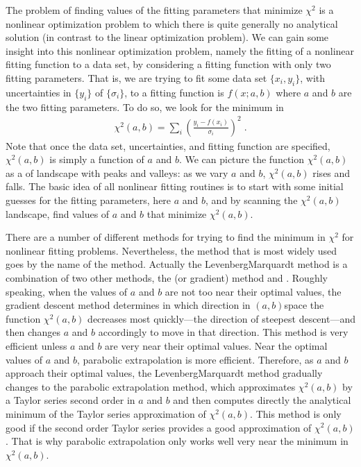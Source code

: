 \documentclass[letterpaper,10pt,english]{sphinxmanual}
\begin{document}
\sphinxAtStartPar
The problem of finding values of the fitting parameters that minimize \(\chi^2\) is a nonlinear optimization problem to which there is quite generally no analytical solution (in contrast to the linear optimization problem).  We can gain some insight into this nonlinear optimization problem, namely the fitting of a nonlinear fitting function to a data set, by considering a fitting function with only two fitting parameters.  That is, we are trying to fit some data set \(\{x_{i},y_{i}\}\), with uncertainties in \(\{y_{i}\}\) of \(\{\sigma_{i}\}\), to a fitting function is \(f(x;a,b)\) where \(a\) and \(b\) are the two fitting parameters.  To do so, we look for the minimum in
\begin{equation*}
\begin{split}\chi^2(a,b) = \sum_{i} \left(\frac{y_{i} - f(x_{i})}{\sigma_{i}}\right)^2 \;.\end{split}
\end{equation*}
\sphinxAtStartPar
Note that once the data set, uncertainties, and fitting function are specified,  \(\chi^2(a,b)\) is simply a function of \(a\) and \(b\).  We can picture the function \(\chi^2(a,b)\) as a of landscape with peaks and valleys: as we vary \(a\) and \(b\), \(\chi^2(a,b)\) rises and falls.  The basic idea of all nonlinear fitting routines is to start with some initial guesses for the fitting parameters, here \(a\) and \(b\), and by scanning the \(\chi^2(a,b)\) landscape, find values of \(a\) and \(b\) that minimize \(\chi^2(a,b)\).

\sphinxAtStartPar
There are a number of different methods for trying to find the minimum in \(\chi^2\) for nonlinear fitting problems.  Nevertheless, the method that is most widely used goes by the name of the  method.  Actually the Levenberg\sphinxhyphen{}Marquardt method is a combination of two other methods, the  (or gradient) method and .  Roughly speaking, when the values of \(a\) and \(b\) are not too near their optimal values, the gradient descent method determines in which direction in \((a,b)\)\sphinxhyphen{}space the function \(\chi^2(a,b)\) decreases most quickly—the direction of steepest descent—and then changes \(a\) and \(b\) accordingly to move in that direction.  This method is very efficient unless \(a\) and \(b\) are very near their optimal values.  Near the optimal values of \(a\) and \(b\), parabolic extrapolation is more efficient.  Therefore, as  \(a\) and \(b\) approach their optimal values, the Levenberg\sphinxhyphen{}Marquardt method gradually changes to the parabolic extrapolation method, which approximates \(\chi^2(a,b)\) by a Taylor series second order in \(a\) and \(b\) and then computes directly the analytical minimum of the Taylor series approximation of \(\chi^2(a,b)\).  This method is only good if the second order Taylor series provides a good approximation of \(\chi^2(a,b)\).  That is why parabolic extrapolation only works well very near the minimum in \(\chi^2(a,b)\).
\end{document}
